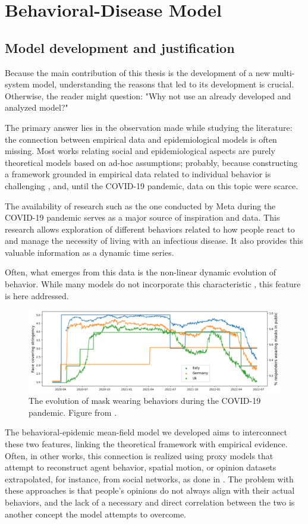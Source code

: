 \part{Behavioral-Disease Model}
\label{part:the_model}
\chapter{Model development and justification}
\label{ch:why_new}
Because the main contribution of this thesis is the development of a new multi-system model, understanding the reasons that led to its development is crucial.
Otherwise, the reader might question: "Why not use an already developed and analyzed model?"

The primary answer lies in the observation made while studying the literature: the connection between empirical data and epidemiological models is often missing. Most works relating social and epidemiological aspects are purely theoretical models based on ad-hoc assumptions; probably, because constructing a framework grounded in empirical data related to individual behavior is challenging \cite{Nunner2021}, and, until the COVID-19 pandemic, data on this topic were scarce.

The availability of research such as the one conducted by Meta during the COVID-19 pandemic \cite{Astley_2021} serves as a major source of inspiration and data. This research allows exploration of different behaviors related to how people react to and manage the necessity of living with an infectious disease. It also provides this valuable information as a dynamic time series.

Often, what emerges from this data is the non-linear dynamic evolution of behavior. While many models do not incorporate this characteristic \cite{huys2010nonlinear}, this feature is here addressed.
\begin{figure}[ht]
	\centering
	\includegraphics[width=0.8\linewidth]{1_corpo/figure/Fig2cut}
	\caption[Mask wearing evolution]{The evolution of mask wearing behaviors during the COVID-19 pandemic. Figure from \cite{Proverbio_Tex_2024}.}
	\label{fig:mask_wearing}
\end{figure}
The behavioral-epidemic mean-field model we developed aims to interconnect these two features, linking the theoretical framework with empirical evidence. Often, in other works, this connection is realized using proxy models that attempt to reconstruct agent behavior, spatial motion, or opinion datasets extrapolated, for instance, from social networks, as done in \cite{Anderson_2019,Zino_2021}. The problem with these approaches is that people's opinions do not always align with their actual behaviors, and the lack of a necessary and direct correlation between the two is another concept the model attempts to overcome.

